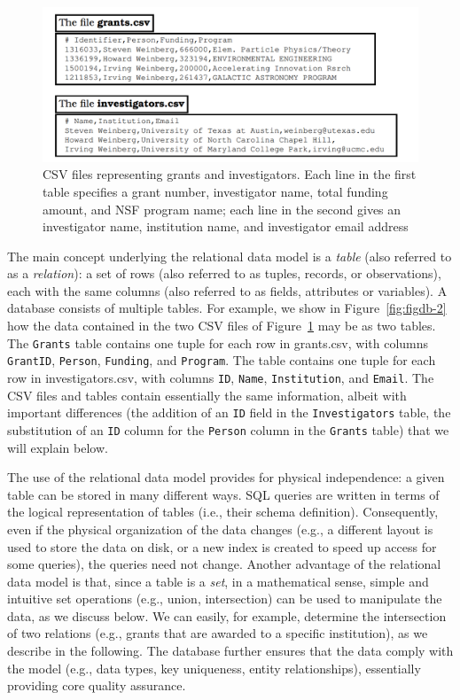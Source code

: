 \documentclass[]{krantz}
\begin{document}
\begin{figure}

{\centering \includegraphics[width=0.7\linewidth]{ChapterDB/figures/figdb-1} 

}

\caption{CSV files representing grants and investigators. Each line in the first table specifies a grant number, investigator name, total funding amount, and NSF program name; each line in the second gives an investigator name, institution name, and investigator email address}\label{fig:figdb-1}
\end{figure}

The main concept underlying the relational data model is a \emph{table}
(also referred to as a \emph{relation}): a set of rows (also referred to
as tuples, records, or observations), each with the same columns (also
referred to as fields, attributes or variables). A database consists of
multiple tables. For example, we show in Figure~\ref{fig:figdb-2} how
the data contained in the two CSV files of Figure~\ref{fig:figdb-1} may
be as two tables. The \texttt{Grants} table contains one tuple for each
row in grants.csv, with columns \texttt{GrantID}, \texttt{Person},
\texttt{Funding}, and \texttt{Program}. The table contains one tuple for
each row in investigators.csv, with columns \texttt{ID}, \texttt{Name},
\texttt{Institution}, and \texttt{Email}. The CSV files and tables
contain essentially the same information, albeit with important
differences (the addition of an \texttt{ID} field in the
\texttt{Investigators} table, the substitution of an \texttt{ID} column
for the \texttt{Person} column in the \texttt{Grants} table) that we
will explain below.

The use of the relational data model provides for physical independence:
a given table can be stored in many different ways. SQL queries are
written in terms of the logical representation of tables (i.e., their
schema definition). Consequently, even if the physical organization of
the data changes (e.g., a different layout is used to store the data on
disk, or a new index is created to speed up access for some queries),
the queries need not change. Another advantage of the relational data
model is that, since a table is a \emph{set}, in a mathematical sense,
simple and intuitive set operations (e.g., union, intersection) can be
used to manipulate the data, as we discuss below. We can easily, for
example, determine the intersection of two relations (e.g., grants that
are awarded to a specific institution), as we describe in the following.
The database further ensures that the data comply with the model (e.g.,
data types, key uniqueness, entity relationships), essentially providing
core quality assurance.
\end{document}
